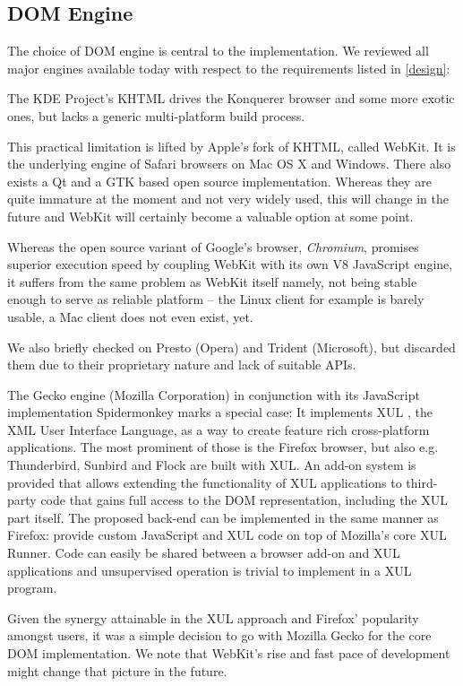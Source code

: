 \subsection{DOM Engine\label{dom}}

The choice of DOM engine is central to the implementation.
We reviewed all major engines available today with respect to the requirements listed in \ref{design}:

The KDE Project's KHTML drives the Konquerer browser and some more exotic ones, but lacks a generic multi-platform build process.

This practical limitation is lifted by Apple's fork of KHTML, called WebKit.
It is the underlying engine of Safari browsers on Mac OS X and Windows. %
There also exists a Qt and a GTK based open source implementation.
Whereas they are quite immature at the moment and not very widely used, this will change in the future and WebKit will certainly become a valuable option at some point.

Whereas the open source variant of Google's browser, \textit{Chromium}, promises superior execution speed by coupling WebKit with its own V8 JavaScript engine, it suffers from the same problem as WebKit itself namely, not being stable enough to serve as reliable platform --
the Linux client for example is barely usable, a Mac client does not even exist, yet.

We also briefly checked on Presto (Opera) and Trident (Microsoft), but discarded them due to their proprietary nature and lack of suitable APIs.

The Gecko engine (Mozilla Corporation) in conjunction with its JavaScript implementation Spidermonkey marks a special case:
It implements XUL \cite{xul}, the XML User Interface Language, as a way to create feature rich cross-platform applications.
The most prominent of those is the Firefox browser, but also e.g. Thunderbird, Sunbird and Flock are built with XUL.
An add-on system is provided that allows extending the functionality of XUL applications to third-party code that gains full access to the DOM representation, including the XUL part itself.
The proposed {\KrdWrd} back-end can be implemented in the same manner as Firefox: provide custom JavaScript and XUL code on top of Mozilla's core XUL Runner. 
Code can easily be shared between a browser add-on and XUL applications and unsupervised operation is trivial to implement in a XUL program.

Given the synergy attainable in the XUL approach and Firefox' popularity amongst users, it was a simple decision to go with Mozilla Gecko for the core DOM implementation.
We note that WebKit's rise and fast pace of development might change that picture in the future.

